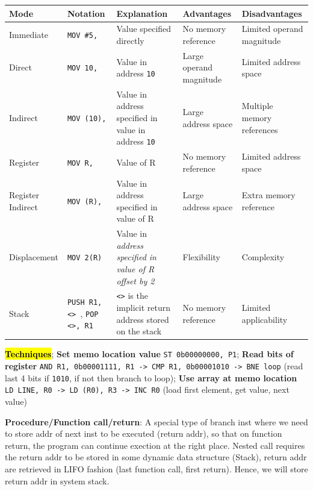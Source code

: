 \documentclass[a4paper]{article}
\begin{document}
\begin{multicols*}{2}
  \begin{tabular}{|p{1.4cm}|p{1cm}|p{2cm}|p{2cm}|p{2cm}|}
    \hline
    \textbf{Mode}     & \textbf{Notation}                          & \textbf{Explanation}                                           & \textbf{Advantages}     & \textbf{Disadvantages}     \\ \hline
    Immediate         & \texttt{MOV \#5, }                         & Value specified directly                                       & No memory reference     & Limited operand magnitude  \\ \hline
    Direct            & \texttt{MOV 10, }                          & Value in address \texttt{10}                                   & Large operand magnitude & Limited address space      \\ \hline
    Indirect          & \texttt{MOV (10), }                        & Value in address specified in value in address \texttt{10}     & Large address space     & Multiple memory references \\ \hline
    Register          & \texttt{MOV R, }                           & Value of R                                                     & No memory reference     & Limited address space      \\ \hline
    Register Indirect & \texttt{MOV (R), }                         & Value in address specified in value of R                       & Large address space     & Extra memory reference     \\ \hline
    Displacement      & \texttt{MOV 2(R)}                          & Value in \textit{address specified in value of R offset by 2}  & Flexibility             & Complexity                 \\ \hline
    Stack             & \texttt{PUSH R1, <> }, \texttt{POP <>, R1} & \texttt{<>} is the implicit return address stored on the stack & No memory reference     & Limited applicability      \\ \hline
  \end{tabular}

  \hl{\textbf{Techniques}}; \textbf{Set memo location value} \texttt{ST 0b00000000, P1}; \textbf{Read bits of register} \texttt{AND R1, 0b00001111, R1 -> CMP R1, 0b00001010 -> BNE loop} (read last 4 bits if \texttt{1010}, if not then branch to loop); \textbf{Use array at memo location} \texttt{LD LINE, R0 -> LD (R0), R3 -> INC R0} (load first element, get value, next value)

  \textbf{Procedure/Function call/return}: A special type of branch inst where we need to store addr of next inst to be executed (return addr), so that on function return, the program can continue exection at the right place. Nested call requires the return addr to be stored in some dynamic data structure (Stack), return addr are retrieved in LIFO fashion (last function call, first return). Hence, we will store return addr in system stack.


\end{multicols*}
\end{document}
